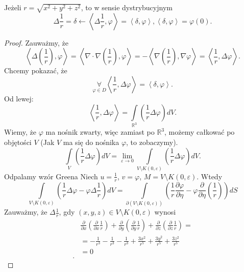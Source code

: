 \documentclass[../main.tex]{subfiles}
\begin{document}
\pagebreak
\begin{stw}
    Jeżeli $r = \sqrt{x^2 + y^2 + z^2}$, to w sensie dystrybucyjnym
    \[
        \Delta \frac{1}{r} = \delta \longleftarrow \left<\Delta \frac{1}{r}, \varphi \right> = \left<\delta, \varphi \right>, \left<\delta, \varphi \right> = \varphi(0)
    .\]
\end{stw}
\begin{proof}
    Zauważmy, że
    \[
        \left<\Delta\left( \frac{1}{r} \right) , \varphi \right> = \left<\nabla\cdot \nabla\left( \frac{1}{r} \right) , \varphi \right> = -\left<\nabla\left( \frac{1}{r} \right) , \nabla \varphi \right> = \left<\frac{1}{r}, \Delta \varphi \right>
    .\]
Chcemy pokazać, że
\[
    \underset{\varphi\in D}{\forall} \left<\frac{1}{r}, \Delta \varphi \right> = \left<\delta, \varphi \right>
.\]
Od lewej:
\[
    \left<\frac{1}{r}, \Delta \varphi \right> = \int\limits_{\mathbb{R}^3}\left( \frac{1}{r}\Delta \varphi \right) dV
.\]
Wiemy, że $\varphi$ ma nośnik zwarty, więc zamiast po $\mathbb{R}^3$, możemy całkować po objętości $V$ (Jak $V$ ma się do nośnika $\varphi$, to zobaczymy).
\[
    \int\limits_{V}\left( \frac{1}{r}\Delta \varphi \right) dV = \lim_{\varepsilon \to 0}\int\limits_{V\setminus K(0,\varepsilon)}\left( \frac{1}{r}\Delta \varphi \right) dV
.\]
Odpalamy {\color{green} wzór Greena}
    Niech $u = \frac{1}{r}$, $v = \varphi$, $M = V\setminus K(0,\varepsilon)$. Wtedy
    \begin{equation}
        \label{eqn:w25-3}
        \int\limits_{V\setminus K(0,\varepsilon)}\left( \frac{1}{r}\Delta \varphi - \varphi\Delta \frac{1}{r} \right)dV = \int\limits_{\partial\left( V\setminus K(0,\varepsilon) \right) }\left( \frac{1}{r}\frac{\partial \varphi}{\partial \eta} - \varphi \frac{\partial }{\partial \eta} \left( \frac{1}{r} \right)  \right) dS\tag{$\clubsuit$}
    \end{equation}
    Zauważmy, że $\Delta \frac{1}{r}$, gdy $(x,y,z)\in V\setminus K(0,\varepsilon)$ wynosi
    \begin{align*}
        &\frac{\partial }{\partial x} \left( \frac{\partial }{\partial x} \frac{1}{r} \right) + \frac{\partial }{\partial y} \left( \frac{\partial }{\partial y} \frac{1}{r} \right) + \frac{\partial }{\partial z} \left( \frac{\partial }{\partial z} \frac{1}{r} \right) = \\
        &= -\frac{1}{r^3} - \frac{1}{r^3} - \frac{1}{r^3} + \frac{3x^2}{r^5} + \frac{3 y^2}{r^5} + \frac{3z^2}{r^5}\\
        &=  0 \\
    .\end{align*}

\end{proof}
\end{document}
